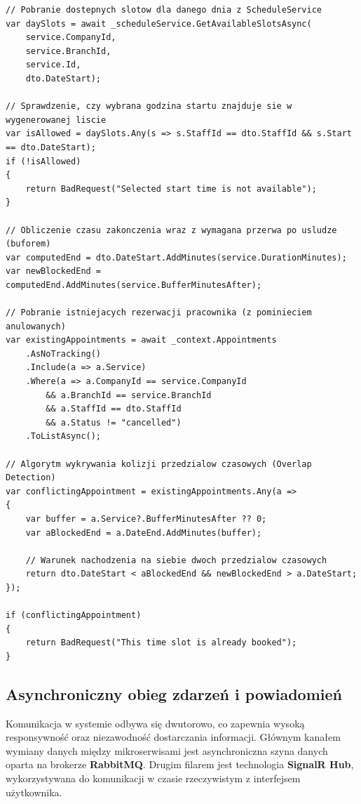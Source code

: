 \begin{lstlisting}[language={[Sharp]C}, caption={Implementacja logiki wykrywania kolizji i walidacji slotów (AppointmentsController.cs)}]
// Pobranie dostepnych slotow dla danego dnia z ScheduleService
var daySlots = await _scheduleService.GetAvailableSlotsAsync(
    service.CompanyId, 
    service.BranchId, 
    service.Id, 
    dto.DateStart);

// Sprawdzenie, czy wybrana godzina startu znajduje sie w wygenerowanej liscie
var isAllowed = daySlots.Any(s => s.StaffId == dto.StaffId && s.Start == dto.DateStart);
if (!isAllowed) 
{
    return BadRequest("Selected start time is not available");
}

// Obliczenie czasu zakonczenia wraz z wymagana przerwa po usludze (buforem)
var computedEnd = dto.DateStart.AddMinutes(service.DurationMinutes);
var newBlockedEnd = computedEnd.AddMinutes(service.BufferMinutesAfter);

// Pobranie istniejacych rezerwacji pracownika (z pominieciem anulowanych)
var existingAppointments = await _context.Appointments
    .AsNoTracking()
    .Include(a => a.Service)
    .Where(a => a.CompanyId == service.CompanyId
        && a.BranchId == service.BranchId
        && a.StaffId == dto.StaffId
        && a.Status != "cancelled")
    .ToListAsync();

// Algorytm wykrywania kolizji przedzialow czasowych (Overlap Detection)
var conflictingAppointment = existingAppointments.Any(a =>
{
    var buffer = a.Service?.BufferMinutesAfter ?? 0;
    var aBlockedEnd = a.DateEnd.AddMinutes(buffer);
    
    // Warunek nachodzenia na siebie dwoch przedzialow czasowych
    return dto.DateStart < aBlockedEnd && newBlockedEnd > a.DateStart;
});

if (conflictingAppointment) 
{
    return BadRequest("This time slot is already booked");
}
\end{lstlisting}

\subsection{Asynchroniczny obieg zdarzeń i powiadomień}
Komunikacja w systemie odbywa się dwutorowo, co zapewnia wysoką responsywność oraz niezawodność dostarczania informacji. Głównym kanałem wymiany danych między mikroserwisami jest asynchroniczna szyna danych oparta na brokerze \textbf{RabbitMQ}. Drugim filarem jest technologia \textbf{SignalR Hub}, wykorzystywana do komunikacji w czasie rzeczywistym z interfejsem użytkownika.

